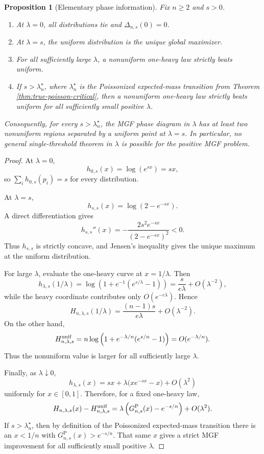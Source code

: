 \documentclass[11pt]{article}
\newtheorem{proposition}[theorem]{Proposition}
\theoremstyle{definition}
\begin{document}
\begin{proposition}[Elementary phase information]\label{prop:mgf-phase-info}
Fix $n\ge2$ and $s>0$.
\begin{enumerate}[label=\textup{(\alph*)}]
\item At $\lambda=0$, all distributions tie and $\Delta_{n,s}(0)=0$.
\item At $\lambda=s$, the uniform distribution is the unique global maximizer.
\item For all sufficiently large $\lambda$, a nonuniform one-heavy law strictly beats uniform.
\item If $s>\lambda_n^\star$, where $\lambda_n^\star$ is the Poissonized expected-mass transition from Theorem \ref{thm:true-poisson-critical}, then a nonuniform one-heavy law strictly beats uniform for all sufficiently small positive $\lambda$.
\end{enumerate}
Consequently, for every $s>\lambda_n^\star$, the MGF phase diagram in $\lambda$ has at least two nonuniform regions separated by a uniform point at $\lambda=s$. In particular, no general single-threshold theorem in $\lambda$ is possible for the positive MGF problem.
\end{proposition}

\begin{proof}
At $\lambda=0$,
\[
  h_{0,s}(x)=\log(e^{sx})=sx,
\]
so $\sum_i h_{0,s}(p_i)=s$ for every distribution.

At $\lambda=s$,
\[
  h_{s,s}(x)=\log(2-e^{-sx}).
\]
A direct differentiation gives
\[
  h_{s,s}''(x)=-\frac{2s^2e^{-sx}}{(2-e^{-sx})^2}<0.
\]
Thus $h_{s,s}$ is strictly concave, and Jensen's inequality gives the unique maximum at the uniform distribution.

For large $\lambda$, evaluate the one-heavy curve at $x=1/\lambda$.  Then
\[
  h_{\lambda,s}(1/\lambda)
  =\log\left(1+e^{-1}(e^{s/\lambda}-1)\right)
  =\frac{s}{e\lambda}+O(\lambda^{-2}),
\]
while the heavy coordinate contributes only $O(e^{-c\lambda})$. Hence
\[
  H_{n,\lambda,s}(1/\lambda)
  =\frac{(n-1)s}{e\lambda}+O(\lambda^{-2}).
\]
On the other hand,
\[
  H^{\rm unif}_{n,\lambda,s}
  =n\log\left(1+e^{-\lambda/n}(e^{s/n}-1)\right)
  =O(e^{-\lambda/n}).
\]
Thus the nonuniform value is larger for all sufficiently large $\lambda$.

Finally, as $\lambda\downarrow0$,
\[
  h_{\lambda,s}(x)
  =sx+\lambda\bigl(xe^{-sx}-x\bigr)+O(\lambda^2)
\]
uniformly for $x\in[0,1]$. Therefore, for a fixed one-heavy law,
\[
  H_{n,\lambda,s}(x)-H^{\rm unif}_{n,\lambda,s}
  =\lambda\left(G^{\mathrm P}_{n,s}(x)-e^{-s/n}\right)+O(\lambda^2).
\]
If $s>\lambda_n^\star$, then by definition of the Poissonized expected-mass transition there is an $x<1/n$ with $G^{\mathrm P}_{n,s}(x)>e^{-s/n}$.  That same $x$ gives a strict MGF improvement for all sufficiently small positive $\lambda$.
\end{proof}
\end{document}
